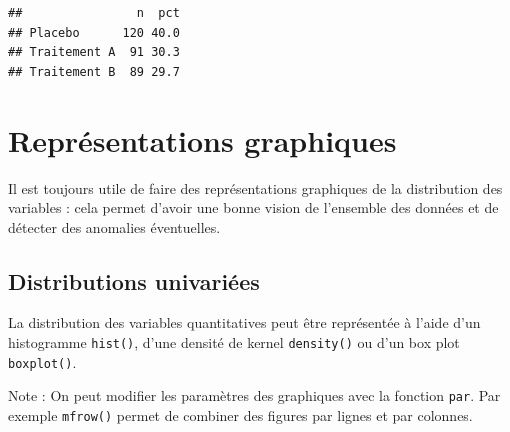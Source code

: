 \documentclass[
]{book}
\newenvironment{Shaded}{\begin{snugshade}}{\end{snugshade}}
\newcommand{\AttributeTok}[1]{\textcolor[rgb]{0.13,0.29,0.53}{#1}}
\newcommand{\DecValTok}[1]{\textcolor[rgb]{0.00,0.00,0.81}{#1}}
\newcommand{\DocumentationTok}[1]{\textcolor[rgb]{0.56,0.35,0.01}{\textbf{\textit{#1}}}}
\newcommand{\FunctionTok}[1]{\textcolor[rgb]{0.13,0.29,0.53}{\textbf{#1}}}
\newcommand{\NormalTok}[1]{#1}
\newcommand{\OtherTok}[1]{\textcolor[rgb]{0.56,0.35,0.01}{#1}}
\newcommand{\SpecialCharTok}[1]{\textcolor[rgb]{0.81,0.36,0.00}{\textbf{#1}}}
\newcommand{\StringTok}[1]{\textcolor[rgb]{0.31,0.60,0.02}{#1}}
\begin{document}
\begin{Shaded}
\end{Shaded}

\begin{verbatim}
##                n  pct
## Placebo      120 40.0
## Traitement A  91 30.3
## Traitement B  89 29.7
\end{verbatim}

\section{Représentations graphiques}\label{repruxe9sentations-graphiques}

Il est toujours utile de faire des représentations graphiques de la distribution des variables : cela permet d'avoir une bonne vision de l'ensemble des données et de détecter des anomalies éventuelles.

\subsection{Distributions univariées}\label{distributions-univariuxe9es}

La distribution des variables quantitatives peut être représentée à l'aide d'un histogramme \texttt{hist()}, d'une densité de kernel \texttt{density()} ou d'un box plot \texttt{boxplot()}.

Note : On peut modifier les paramètres des graphiques avec la fonction \texttt{par}. Par exemple \texttt{mfrow()} permet de combiner des figures par lignes et par colonnes.

\begin{Shaded}
\end{Shaded}
\end{document}
